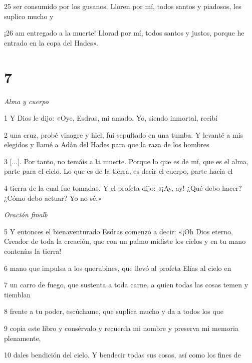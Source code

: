 \par 25 ser consumido por los gusanos. Lloren por mí, todos santos y piadosos, les suplico mucho y

\par ¡26 am entregado a la muerte! Llorad por mí, todos santos y justos, porque he entrado en la copa del Hades».

\chapter{7}

\par \textit{Alma y cuerpo}

\par 1 Y Dios le dijo: «Oye, Esdras, mi amado. Yo, siendo inmortal, recibí

\par 2 una cruz, probé vinagre y hiel, fui sepultado en una tumba. Y levanté a mis elegidos y llamé a Adán del Hades para que la raza de los hombres

\par 3 [...]. Por tanto, no temáis a la muerte. Porque lo que es de mí, que es el alma, parte para el cielo. Lo que es de la tierra, es decir el cuerpo, parte hacia el

\par 4 tierra de la cual fue tomada». Y el profeta dijo: «¡Ay, ay! ¿Qué debo hacer? ¿Cómo debo actuar? Yo no sé.»

\par \textit{Oración finalb}

\par 5 Y entonces el bienaventurado Esdras comenzó a decir: «¡Oh Dios eterno, Creador de toda la creación, que con un palmo midiste los cielos y en tu mano contenías la tierra!

\par 6 mano que impulsa a los querubines, que llevó al profeta Elías al cielo en

\par 7 un carro de fuego, que sustenta a toda carne, a quien todas las cosas temen y tiemblan

\par 8 frente a tu poder, escúchame, que suplica mucho y da a todos los que

\par 9 copia este libro y consérvalo y recuerda mi nombre y preserva mi memoria plenamente,

\par 10 dales bendición del cielo. Y bendecir todas sus cosas, así como los fines de

